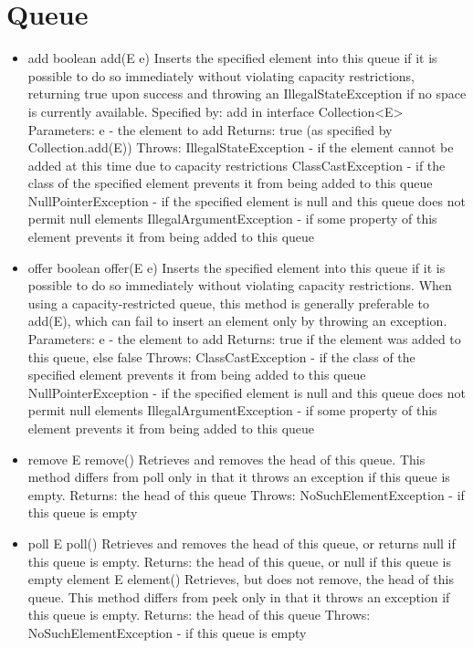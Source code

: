 \documentclass{book}
\begin{document}
\section{Queue}
\begin{itemize} 
	\item add
	boolean add(E e)
	Inserts the specified element into this queue if it is possible to do so immediately without violating capacity restrictions, returning true upon success and throwing an IllegalStateException if no space is currently available.
	Specified by:
	add in interface Collection<E>
	Parameters:
	e - the element to add
	Returns:
	true (as specified by Collection.add(E))
	Throws:
	IllegalStateException - if the element cannot be added at this time due to capacity restrictions
	ClassCastException - if the class of the specified element prevents it from being added to this queue
	NullPointerException - if the specified element is null and this queue does not permit null elements
	IllegalArgumentException - if some property of this element prevents it from being added to this queue
	
	\item offer
	boolean offer(E e)
	Inserts the specified element into this queue if it is possible to do so immediately without violating capacity restrictions. When using a capacity-restricted queue, this method is generally preferable to add(E), which can fail to insert an element only by throwing an exception.
	Parameters:
	e - the element to add
	Returns:
	true if the element was added to this queue, else false
	Throws:
	ClassCastException - if the class of the specified element prevents it from being added to this queue
	NullPointerException - if the specified element is null and this queue does not permit null elements
	IllegalArgumentException - if some property of this element prevents it from being added to this queue
	
	\item remove
	E remove()
	Retrieves and removes the head of this queue. This method differs from poll only in that it throws an exception if this queue is empty.
	Returns:
	the head of this queue
	Throws:
	NoSuchElementException - if this queue is empty
	
	\item poll
	E poll()
	Retrieves and removes the head of this queue, or returns null if this queue is empty.
	Returns:
	the head of this queue, or null if this queue is empty
	element
	E element()
	Retrieves, but does not remove, the head of this queue. This method differs from peek only in that it throws an exception if this queue is empty.
	Returns:
	the head of this queue
	Throws:
	NoSuchElementException - if this queue is empty
	

\end{itemize}
\end{document}
